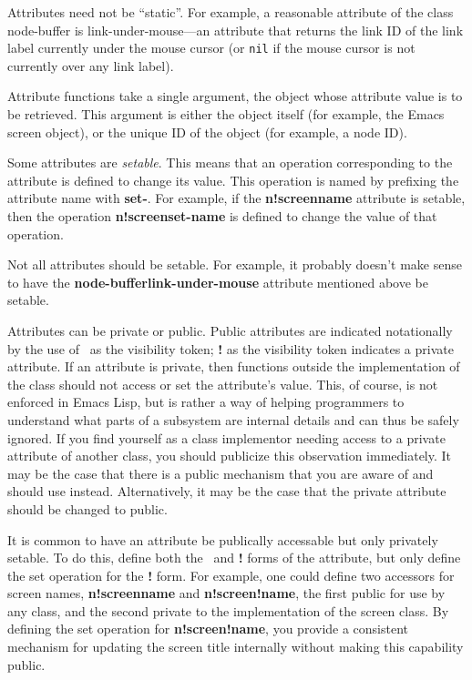 Attributes need not be ``static''.  For example, a reasonable
attribute of the class {\sf node-buffer} is {\sf
link-under-mouse}---an attribute that returns the link ID of the link
label currently under the mouse cursor (or {\tt nil} if the mouse
cursor is not currently over any link label).

Attribute functions take a single argument, the object whose attribute
value is to be retrieved.  This argument is either the object itself
(for example, the Emacs screen object), or the unique ID of the object
(for example, a node ID).

Some attributes are {\em setable}.  This means that an operation
corresponding to the attribute is defined to change its value. This
operation is named by prefixing the attribute name with {\bf set-}.
For example, if the {\bf n!screen\STAR name} attribute is setable,
then the operation {\bf n!screen\STAR set-name} is defined to change
the value of that operation.

Not all attributes should be setable.  For example, it probably
doesn't make sense to have the {\bf node-buffer\STAR link-under-mouse}
attribute mentioned above be setable.

Attributes can be private or public.  Public attributes are indicated
notationally by the use of \STAR\ as the visibility token; {\bf !} as
the visibility token indicates a private attribute.  If an attribute is
private, then functions outside the implementation of the class should
not access or set the attribute's value.  This, of course, is not
enforced in Emacs Lisp, but is rather a way of helping programmers to 
understand what parts of a subsystem are internal details and can thus
be safely ignored.  If you find yourself as a class implementor needing 
access to a private attribute of another class, you should publicize this
observation immediately.  It may be the case that there is a public mechanism
that you are aware of and should use instead.  Alternatively, it may be
the case that the private attribute should be changed to public.

It is common to have an attribute be publically accessable but only 
privately setable.  To do this, define both the \STAR\ and {\bf !} 
forms of the attribute, but only define the set operation for the {\bf !} form.
For example, one could define two accessors for screen names, 
{\bf n!screen\STAR name} and {\bf n!screen!name}, the first public for use
by any class, and the second private to the implementation of the screen
class.  By defining the set operation for {\bf n!screen!name}, you provide
a consistent mechanism for updating the screen title internally without
making this capability public. 

